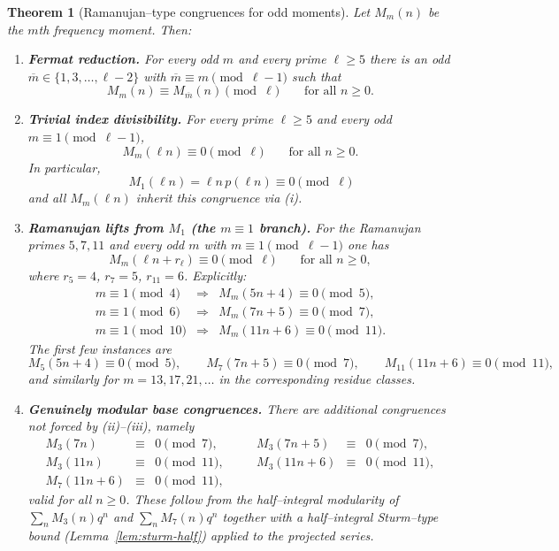 \documentclass[11pt]{article}
\newtheorem{theorem}{Theorem}[section]
\theoremstyle{definition}
\theoremstyle{remark}
\begin{document}
\begin{theorem}[Ramanujan--type congruences for odd moments]\label{thm:ram-unified}
Let $M_m(n)$ be the $m$th frequency moment. Then:

\begin{enumerate}
\item[\textup{(i)}] \textbf{Fermat reduction.}
For every odd $m$ and every prime $\ell\ge5$ there is an odd
$\overline m\in\{1,3,\dots,\ell-2\}$ with $\overline m\equiv m\pmod{\ell-1}$ such that
\[
M_m(n)\equiv M_{\overline m}(n)\pmod{\ell}\qquad\text{for all }n\ge0.
\]

\item[\textup{(ii)}] \textbf{Trivial index divisibility.}
For every prime $\ell\ge5$ and every odd $m\equiv1\pmod{\ell-1}$,
\[
M_m(\ell n)\equiv0\pmod{\ell}\qquad\text{for all }n\ge0.
\]
In particular,
\[
M_1(\ell n)=\ell n\,p(\ell n)\equiv0\pmod{\ell}
\]
and all $M_m(\ell n)$ inherit this congruence via \textup{(i)}.

\item[\textup{(iii)}] \textbf{Ramanujan lifts from $M_1$ (the $m\equiv1$ branch).}
For the Ramanujan primes $5,7,11$ and every odd $m$ with
$m\equiv1\pmod{\ell-1}$ one has
\[
M_m(\ell n+r_\ell)\equiv0\pmod{\ell}\qquad\text{for all }n\ge0,
\]
where $r_5=4$, $r_7=5$, $r_{11}=6$.  Explicitly:
\[
\begin{array}{rcl}
m\equiv1\pmod4  &\Longrightarrow& M_m(5n+4)\equiv0\pmod5,\\[3pt]
m\equiv1\pmod6  &\Longrightarrow& M_m(7n+5)\equiv0\pmod7,\\[3pt]
m\equiv1\pmod{10}&\Longrightarrow& M_m(11n+6)\equiv0\pmod{11}.
\end{array}
\]
The first few instances are
\[
M_5(5n+4)\equiv0\pmod5,\qquad
M_7(7n+5)\equiv0\pmod7,\qquad
M_{11}(11n+6)\equiv0\pmod{11},
\]
and similarly for $m=13,17,21,\dots$ in the corresponding residue classes.

\item[\textup{(iv)}] \textbf{Genuinely modular base congruences.}
There are additional congruences not forced by \textup{(ii)}–\textup{(iii)},
namely
\[
\begin{array}{rclcrcl}
M_3(7n)&\equiv&0\pmod7, &\quad& M_3(7n+5)&\equiv&0\pmod7,\\[2pt]
M_3(11n)&\equiv&0\pmod{11},&\quad&
M_3(11n+6)&\equiv&0\pmod{11},\\[2pt]
M_7(11n+6)&\equiv&0\pmod{11},
\end{array}
\]
valid for all $n\ge0$.  These follow from the half--integral modularity of
$\sum_n M_3(n)q^n$ and $\sum_n M_7(n)q^n$ together with a half--integral
Sturm--type bound (Lemma~\ref{lem:sturm-half}) applied to the projected
series.


\end{enumerate}
\end{theorem}
\end{document}
